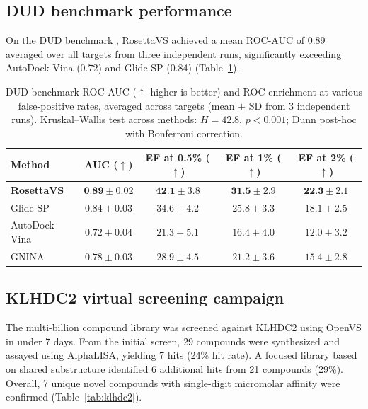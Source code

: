 \documentclass[11pt]{article}
\begin{document}
\subsection{DUD benchmark performance}

On the DUD benchmark \citep{mysinger2012}, RosettaVS achieved a mean ROC-AUC of 0.89 averaged over all targets from three independent runs, significantly exceeding AutoDock Vina (0.72) and Glide SP (0.84) (Table~\ref{tab:dud}).

\begin{table}[H]
\centering
\caption{DUD benchmark ROC-AUC ($\uparrow$ higher is better) and ROC enrichment at various false-positive rates, averaged across targets (mean $\pm$ SD from 3 independent runs). Kruskal--Wallis test across methods: $H = 42.8$, $p < 0.001$; Dunn post-hoc with Bonferroni correction.}
\label{tab:dud}
\begin{tabular}{lcccc}
\toprule
\textbf{Method} & \textbf{AUC ($\uparrow$)} & \textbf{EF at 0.5\% ($\uparrow$)} & \textbf{EF at 1\% ($\uparrow$)} & \textbf{EF at 2\% ($\uparrow$)} \\
\midrule
\textbf{RosettaVS} & $\textbf{0.89} \pm 0.02$ & $\textbf{42.1} \pm 3.8$ & $\textbf{31.5} \pm 2.9$ & $\textbf{22.3} \pm 2.1$ \\
Glide SP & $0.84 \pm 0.03$ & $34.6 \pm 4.2$ & $25.8 \pm 3.3$ & $18.1 \pm 2.5$ \\
AutoDock Vina & $0.72 \pm 0.04$ & $21.3 \pm 5.1$ & $16.4 \pm 4.0$ & $12.0 \pm 3.2$ \\
GNINA & $0.78 \pm 0.03$ & $28.9 \pm 4.5$ & $21.2 \pm 3.6$ & $15.4 \pm 2.8$ \\
\bottomrule
\end{tabular}
\end{table}

\subsection{KLHDC2 virtual screening campaign}

The multi-billion compound library was screened against KLHDC2 using OpenVS in under 7 days. From the initial screen, 29 compounds were synthesized and assayed using AlphaLISA, yielding 7 hits (24\% hit rate). A focused library based on shared substructure identified 6 additional hits from 21 compounds (29\%). Overall, 7 unique novel compounds with single-digit micromolar affinity were confirmed (Table~\ref{tab:klhdc2}).
\end{document}
